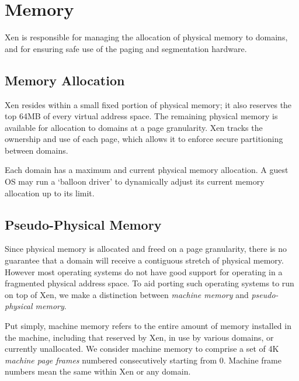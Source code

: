 \chapter{Memory}
\label{c:memory} 

Xen is responsible for managing the allocation of physical memory to
domains, and for ensuring safe use of the paging and segmentation
hardware.


\section{Memory Allocation}

Xen resides within a small fixed portion of physical memory; it also
reserves the top 64MB of every virtual address space. The remaining
physical memory is available for allocation to domains at a page
granularity.  Xen tracks the ownership and use of each page, which
allows it to enforce secure partitioning between domains.

Each domain has a maximum and current physical memory allocation.  A
guest OS may run a `balloon driver' to dynamically adjust its current
memory allocation up to its limit.



\section{Pseudo-Physical Memory}

Since physical memory is allocated and freed on a page granularity,
there is no guarantee that a domain will receive a contiguous stretch
of physical memory. However most operating systems do not have good
support for operating in a fragmented physical address space. To aid
porting such operating systems to run on top of Xen, we make a
distinction between \emph{machine memory} and \emph{pseudo-physical
  memory}.

Put simply, machine memory refers to the entire amount of memory
installed in the machine, including that reserved by Xen, in use by
various domains, or currently unallocated. We consider machine memory
to comprise a set of 4K \emph{machine page frames} numbered
consecutively starting from 0. Machine frame numbers mean the same
within Xen or any domain.

